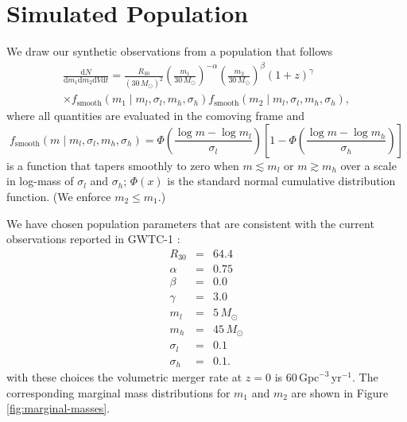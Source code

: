 \documentclass[modern]{aastex62}
\newcommand{\dd}{\mathrm{d}}
\newcommand{\diff}[2]{\frac{\dd #1}{\dd #2}}
\newcommand{\fsm}{f_{\mathrm{smooth}}}
\newcommand{\MSun}{M_\odot}
\newcommand{\perGpcyr}{\mathrm{Gpc}^{-3} \, \mathrm{yr}^{-1}}
\begin{document}



\appendix

\setcounter{figure}{0}
\renewcommand{\figurename}{Extended Data Figure}
\renewcommand{\tablename}{Extended Data Table}

\section{Simulated Population}
\label{sec:simulated-population}

We draw our synthetic observations from a population that follows
%
\begin{multline}
  \label{eq:population}
  \diff{N}{m_1 \dd m_2 \dd V \dd t} = \frac{R_{30}}{\left( 30 \, \MSun \right)^2} \left( \frac{m_1}{30 \, \MSun} \right)^{-\alpha} \left( \frac{m_2}{30 \, \MSun} \right)^{\beta} \left( 1 + z \right)^{\gamma} \\ \times \fsm\left( m_1 \mid m_l, \sigma_l, m_h, \sigma_h \right) \fsm\left( m_2 \mid m_l, \sigma_l, m_h, \sigma_h \right),
\end{multline}
%
where all quantities are evaluated in the comoving frame and
%
\begin{equation}
  \label{eq:smooth}
  \fsm\left( m \mid m_l, \sigma_l, m_h, \sigma_h \right) = \Phi\left( \frac{\log m - \log m_l}{\sigma_l} \right) \left[ 1 - \Phi\left( \frac{\log m - \log m_h}{\sigma_h} \right) \right]
\end{equation}
%
is a function that tapers smoothly to zero when $m \lesssim m_l$ or $m \gtrsim
m_h$ over a scale in log-mass of $\sigma_l$ and $\sigma_h$; $\Phi(x)$ is the
standard normal cumulative distribution function.  (We enforce $m_2 \leq m_1$.)

We have chosen population parameters that are consistent with the current
observations reported in GWTC-1 \citep{GWTC-1,O1O2Population}:
%
\begin{eqnarray}
  \label{eq:parameters}
  R_{30} & = & 64.4 \\
  \alpha & = & 0.75 \\
  \beta & = & 0.0 \\
  \gamma & = & 3.0 \\
  m_l & = & 5 \, \MSun \\
  m_h & = & 45 \, \MSun \\
  \sigma_l & = & 0.1 \\
  \sigma_h & = & 0.1.
\end{eqnarray}
%
with these choices the volumetric merger rate at $z = 0$ is $60 \, \perGpcyr$.
The corresponding marginal mass distributions for $m_1$ and $m_2$ are shown in
Figure \ref{fig:marginal-masses}.
\end{document}
